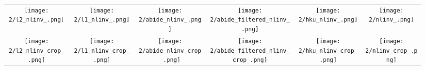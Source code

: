 \begin{tabular}{c @{\hskip 0pt} c @{\hskip 0pt} c @{\hskip 0pt} c @{\hskip 0pt} c @{\hskip 0pt} c}
    \texttt{[image: 2/l2\_nlinv\_.png]}&
    \texttt{[image: 2/l1\_nlinv\_.png]}&
    \texttt{[image: 2/abide\_nlinv\_.png]}&
    \texttt{[image: 2/abide\_filtered\_nlinv\_.png]}&
    \texttt{[image: 2/hku\_nlinv\_.png]}&
    \texttt{[image: 2/nlinv\_.png]}\\
    \texttt{[image: 2/l2\_nlinv\_crop\_.png]}&
    \texttt{[image: 2/l1\_nlinv\_crop\_.png]}&
    \texttt{[image: 2/abide\_nlinv\_crop\_.png]}&
    \texttt{[image: 2/abide\_filtered\_nlinv\_crop\_.png]}&
    \texttt{[image: 2/hku\_nlinv\_crop\_.png]}&
    \texttt{[image: 2/nlinv\_crop\_.png]}
\end{tabular}

